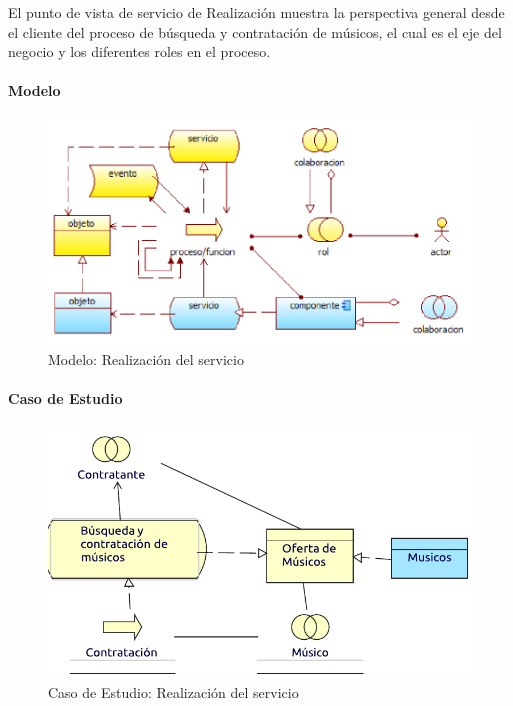 El punto de vista de servicio de Realización muestra la perspectiva general desde el cliente del proceso de búsqueda y contratación de músicos, el cual es el eje del negocio y los diferentes roles en el proceso.

\paragraph{Modelo}
\begin{figure}[h!]
	\centering
	\includegraphics[width=\linewidth]{Desarrollo/ArquitecturaEmpresarial/Tecnologia/imgs/realizacionMetamodelo.PNG}
	\caption{Modelo: Realización del servicio}
\end{figure}
\newpage
\paragraph{Caso de Estudio}

\begin{figure}[hbt!]
	\centering
	\includegraphics[width=\linewidth]{Desarrollo/ArquitecturaEmpresarial/Tecnologia/imgs/realizacion.pdf}
	\caption{Caso de Estudio: Realización del servicio}
\end{figure}

